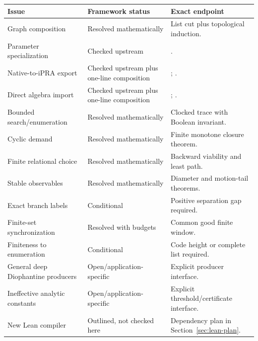 \begin{longtable}{L{0.29\textwidth}L{0.18\textwidth}L{0.44\textwidth}}
\toprule
Issue & Framework status & Exact endpoint \\
\midrule
Graph composition & Resolved mathematically & List cut plus topological induction.\\
Parameter specialization & Checked upstream & .\\
Native-to-iPRA export & Checked upstream plus one-line composition & ; .\\
Direct algebra import & Checked upstream plus one-line composition & ; .\\
Bounded search/enumeration & Resolved mathematically & Clocked trace with Boolean invariant.\\
Cyclic demand & Resolved mathematically & Finite monotone closure theorem.\\
Finite relational choice & Resolved mathematically & Backward viability and least path.\\
Stable observables & Resolved mathematically & Diameter and motion-tail theorems.\\
Exact branch labels & Conditional & Positive separation gap required.\\
Finite-set synchronization & Resolved with budgets & Common good finite window.\\
Finiteness to enumeration & Conditional & Code height or complete list required.\\
General deep Diophantine producers & Open/application-specific & Explicit producer interface.\\
Ineffective analytic constants & Open/application-specific & Explicit threshold/certificate interface.\\
New Lean compiler & Outlined, not checked here & Dependency plan in Section~\ref{sec:lean-plan}.\\
\bottomrule
\end{longtable}
